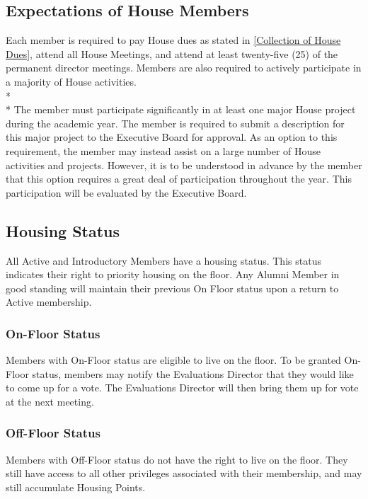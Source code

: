 \documentclass{article}
\newcommand{\bsection}[1]{\subsection{#1} \label{#1}}
\newcommand{\bsubsection}[1]{\subsubsection{#1} \label{#1}}
\begin{document}
\bsection{Expectations of House Members}
Each member is required to pay House dues as stated in \ref{Collection of House Dues}, attend all House Meetings, and attend at least twenty-five (25) of the permanent director meetings. Members are also required to actively participate in a majority of House activities.
\\* \\*
The member must participate significantly in at least one major House project during the academic year. The member is required to submit a description for this major project to the Executive Board for approval. As an option to this requirement, the member may instead assist on a large number of House activities and projects. However, it is to be understood in advance by the member that this option requires a great deal of participation throughout the year. This participation will be evaluated by the Executive Board.

\bsection{Housing Status}
All Active and Introductory Members have a housing status. This status indicates their right to priority housing on the floor. Any Alumni Member in good standing will maintain their previous On Floor status upon a return to Active membership.
\bsubsection{On-Floor Status}
Members with On-Floor status are eligible to live on the floor. To be granted On-Floor status, members may notify the Evaluations Director that they would like to come up for a vote. The Evaluations Director will then bring them up for vote at the next meeting.
\bsubsection{Off-Floor Status}
Members with Off-Floor status do not have the right to live on the floor. They still have access to all other privileges associated with their membership, and may still accumulate Housing Points.
\end{document}
